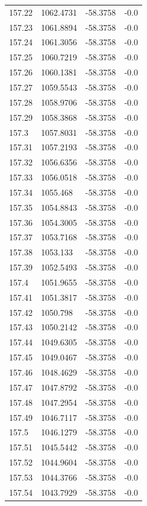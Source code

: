 \begin{table}[H]
\begin{tabular}{llll}
157.22 & 1062.4731 & -58.3758 & -0.0 \\
157.23 & 1061.8894 & -58.3758 & -0.0 \\
157.24 & 1061.3056 & -58.3758 & -0.0 \\
157.25 & 1060.7219 & -58.3758 & -0.0 \\
157.26 & 1060.1381 & -58.3758 & -0.0 \\
157.27 & 1059.5543 & -58.3758 & -0.0 \\
157.28 & 1058.9706 & -58.3758 & -0.0 \\
157.29 & 1058.3868 & -58.3758 & -0.0 \\
157.3 & 1057.8031 & -58.3758 & -0.0 \\
157.31 & 1057.2193 & -58.3758 & -0.0 \\
157.32 & 1056.6356 & -58.3758 & -0.0 \\
157.33 & 1056.0518 & -58.3758 & -0.0 \\
157.34 & 1055.468 & -58.3758 & -0.0 \\
157.35 & 1054.8843 & -58.3758 & -0.0 \\
157.36 & 1054.3005 & -58.3758 & -0.0 \\
157.37 & 1053.7168 & -58.3758 & -0.0 \\
157.38 & 1053.133 & -58.3758 & -0.0 \\
157.39 & 1052.5493 & -58.3758 & -0.0 \\
157.4 & 1051.9655 & -58.3758 & -0.0 \\
157.41 & 1051.3817 & -58.3758 & -0.0 \\
157.42 & 1050.798 & -58.3758 & -0.0 \\
157.43 & 1050.2142 & -58.3758 & -0.0 \\
157.44 & 1049.6305 & -58.3758 & -0.0 \\
157.45 & 1049.0467 & -58.3758 & -0.0 \\
157.46 & 1048.4629 & -58.3758 & -0.0 \\
157.47 & 1047.8792 & -58.3758 & -0.0 \\
157.48 & 1047.2954 & -58.3758 & -0.0 \\
157.49 & 1046.7117 & -58.3758 & -0.0 \\
157.5 & 1046.1279 & -58.3758 & -0.0 \\
157.51 & 1045.5442 & -58.3758 & -0.0 \\
157.52 & 1044.9604 & -58.3758 & -0.0 \\
157.53 & 1044.3766 & -58.3758 & -0.0 \\
157.54 & 1043.7929 & -58.3758 & -0.0 \\

\end{tabular}
\end{table}
